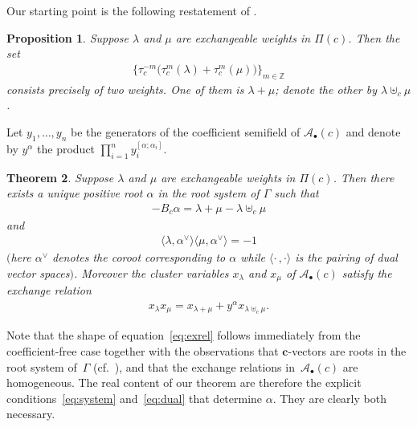 \documentclass[pdftex]{sigma}
\numberwithin{equation}{section}
\newtheorem{Theorem}{Theorem}[section]
\newtheorem{Proposition}[Theorem]{Proposition}
{
  \theoremstyle{Definition}
  \newtheorem{Definition}[Theorem]{Definition}
  \newtheorem{Remark}[Theorem]{Remark}
}
\newcommand{\cA}{\mathcal{A}}
\newcommand{\ZZ}{\mathbb{Z}}
\newcommand{\bc}{\mathbf{c}}
\begin{document}
  Our starting point is the following restatement of \cite[Proposition 5.1]{Ste13}.
  \begin{Proposition}
    Suppose $\lambda$ and $\mu$ are exchangeable weights in $\Pi(c)$.
    Then the set
    \begin{gather*}
       \big\{ \tau_c^{-m}\big(\tau_c^m(\lambda)+\tau_c^m(\mu)\big) \big\}_{m\in\ZZ}
    \end{gather*}
    consists precisely of two weights.
    One of them is $\lambda+\mu$; denote the other by $\lambda\uplus_c\mu$.
  \end{Proposition}

  Let $y_1,\dots,y_n$ be the generators of the coef\/f\/icient semif\/ield of $\cA_\bullet(c)$ and denote by $y^\alpha$ the product $\prod\limits_{i=1}^n y_i^{[\alpha;\alpha_i]}$.

  \begin{Theorem} \label{thm:main} 
    Suppose $\lambda$ and $\mu$ are exchangeable weights in $\Pi(c)$.
    Then there exists a unique positive root $\alpha$ in the root system of $\Gamma$ such that
    \begin{gather} \label{eq:system}
      -B_c\alpha = \lambda+\mu-\lambda\uplus_c\mu
    \end{gather}
    and
    \begin{gather} \label{eq:dual}
      \langle\lambda,\alpha^\vee\rangle \langle\mu,\alpha^\vee\rangle = -1
    \end{gather}
    $($here $\alpha^\vee$ denotes the \emph{coroot} corresponding to $\alpha$ while $\langle\cdot\,,\cdot\rangle$ is the pairing of dual vector spaces$)$.
    Moreover the cluster variables $x_\lambda$ and $x_\mu$ of $\cA_\bullet(c)$ satisfy the exchange relation
    \begin{gather} \label{eq:exrel}
      x_\lambda x_\mu = x_{\lambda+\mu} + y^\alpha x_{\lambda\uplus_c\mu}.
    \end{gather}
  \end{Theorem}

  Note that the shape of equation~\eqref{eq:exrel} follows immediately from the coef\/f\/icient-free case \cite[Proposition~5.2]{Ste13} together with the observations that $\bc$-vectors are roots in the root system of~$\Gamma$ (cf.~\cite{NS14}), and that the exchange relations in~$\cA_\bullet(c)$ are homogeneous.
  The real content of our theorem are therefore the explicit conditions~\eqref{eq:system} and~\eqref{eq:dual} that determine $\alpha$.
  They are clearly both necessary.
\end{document}
